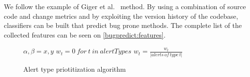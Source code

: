 We follow the example of Giger et al.~\cite{prediction_method} method. By using a combination of source code and change metrics and by exploiting the version history of the codebase, classifiers can be built that predict bug prone methods. The complete list of the collected features can be seen on \cref{bugpredict:features}.

\begin{figure}[H]
	\centering
	\begin{minipage}{.5\linewidth}
		\begin{algorithm}[H]
			\SetAlgoLined
			$\alpha, \beta = x, y$\;
			$w_t = 0 \ for \ t \ in \ alertTypes$\;
			$w_t = \frac{w_t}{|alerts \, of \, type \, t|}$
			\caption{Alert type priotitization algorithm}
		\end{algorithm}
	\end{minipage}
	\label{weight_calc_algo}
\end{figure}

